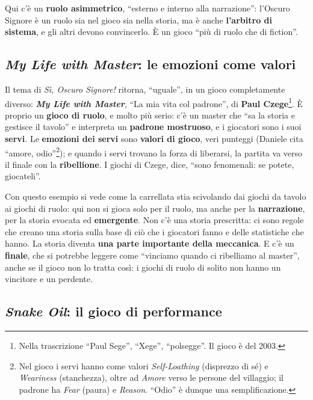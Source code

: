 Qui c'è un \textbf{ruolo asimmetrico}, ``esterno e interno alla narrazione'': l'Oscuro Signore è
un ruolo sia nel gioco sia nella storia, ma è anche \textbf{l'arbitro di sistema}, e gli altri
devono convincerlo. È un gioco ``più di ruolo che di fiction''.

\subsection{\emph{My Life with Master}: le emozioni come valori}



Il tema di \emph{Sì, Oscuro Signore!} ritorna, ``uguale'', in un gioco completamente diverso:
\textbf{\emph{My Life with Master}}, ``La mia vita col padrone'', di \textbf{Paul
Czege}\footnote{Nella trascrizione ``Paul Sege'', ``Xege'', ``polsegge''. Il gioco è del 2003.}.
È proprio un \textbf{gioco di ruolo}, e molto più serio: c'è un master che ``sa la storia e
gestisce il tavolo'' e interpreta un \textbf{padrone mostruoso}, e i giocatori sono i suoi
\textbf{servi}. Le \textbf{emozioni dei servi} sono \textbf{valori di gioco}, veri punteggi
(Daniele cita ``amore, odio''\footnote{Nel gioco i servi hanno come valori \emph{Self-Loathing}
(disprezzo di sé) e \emph{Weariness} (stanchezza), oltre ad \emph{Amore} verso le persone del
villaggio; il padrone ha \emph{Fear} (paura) e \emph{Reason}. ``Odio'' è dunque una
semplificazione.}); e quando i servi trovano la forza di liberarsi, la partita va verso il finale
con la \textbf{ribellione}. I giochi di Czege, dice, ``sono fenomenali: se potete, giocateli''.

Con questo esempio si vede come la carrellata stia scivolando dai giochi da tavolo ai giochi di
ruolo: qui non si gioca solo per il ruolo, ma anche per la \textbf{narrazione}, per la storia
evocata ed \textbf{emergente}. Non c'è una storia prescritta: ci sono regole che creano una storia
sulla base di ciò che i giocatori fanno e delle statistiche che hanno. La storia diventa
\textbf{una parte importante della meccanica}. E c'è un \textbf{finale}, che si potrebbe leggere
come ``vinciamo quando ci ribelliamo al master'', anche se il gioco non lo tratta così: i giochi
di ruolo di solito non hanno un vincitore e un perdente.

\subsection{\emph{Snake Oil}: il gioco di performance}

